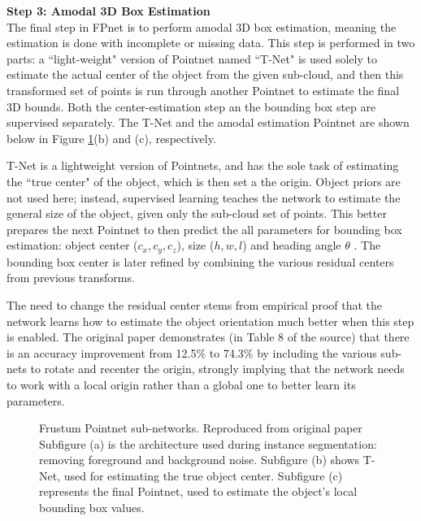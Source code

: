 \textbf{{\large Step 3: Amodal 3D Box Estimation}} \\
The final step in FPnet is to perform amodal 3D box estimation, meaning the estimation is done with incomplete or missing data. This step is performed in two parts: a ``light-weight" version of Pointnet named ``T-Net" is used solely to estimate the actual center of the object from the given sub-cloud, and then this transformed set of points is run through another Pointnet to estimate the final 3D bounds. Both the center-estimation step an the bounding box step are supervised separately. The T-Net and the amodal estimation Pointnet are shown below in Figure \ref{fpnet_subarch}(b) and (c), respectively. 

T-Net is a lightweight version of Pointnets, and has the sole task of estimating the ``true center" \cite{qi_frustum_2017} of the object, which is then set a the origin. Object priors are not used here; instead, supervised learning teaches the network to estimate the general size of the object, given only the sub-cloud set of points. This better prepares the next Pointnet to then predict the all parameters for bounding box estimation: object center ($c_x,c_y,c_z$), size ($h,w,l$) and heading angle $\theta$ \cite{qi_frustum_2017}. The bounding box center is later refined by combining the various residual centers from previous transforms. 

The need to change the residual center stems from empirical proof that the network learns how to estimate the object orientation much better when this step is enabled. The original paper demonstrates (in Table 8 of the source) that there is an accuracy improvement from 12.5\% to 74.3\% by including the various sub-nets to rotate and recenter the origin, strongly implying that the network needs to work with a local origin rather than a global one to better learn its parameters. 

 \begin{figure}[H]
 	\centering
 	\caption{Frustum Pointnet sub-networks. Reproduced from original paper \cite{qi_frustum_2017} Subfigure (a) is the architecture used during instance segmentation: removing foreground and background noise. Subfigure (b) shows T-Net, used for estimating the true object center. Subfigure (c) represents the final Pointnet, used to estimate the object's local bounding box values.}
 	\label{fpnet_subarch}
 \end{figure}


